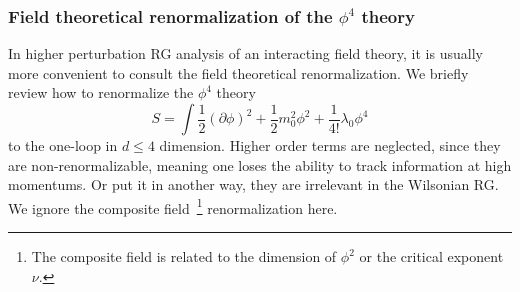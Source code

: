 \documentclass[submission, PhysLectNotes]{SciPost}
\begin{document}
\subsubsection*{Field theoretical renormalization of the $\phi^4$ theory}
In higher perturbation RG analysis of an interacting field theory, it is usually more convenient to consult the field theoretical renormalization. We briefly review how to renormalize the $\phi^4$ theory
\begin{equation}
	S = \int \frac{1}{2}\left(\partial \phi\right)^2 + \frac{1}{2}m_0^2\phi^2 + \frac{1}{4!}\lambda_0 \phi^4
\end{equation}
to the one-loop in $d\leq4$ dimension. Higher order terms are neglected, since they are non-renormalizable, meaning one loses the ability to track information at high momentums. Or put it in another way, they are irrelevant in the Wilsonian RG. We ignore the composite field~\footnote{The composite field is related to the dimension of $\phi^2$ or the critical exponent $\nu$.} renormalization here.
\end{document}
